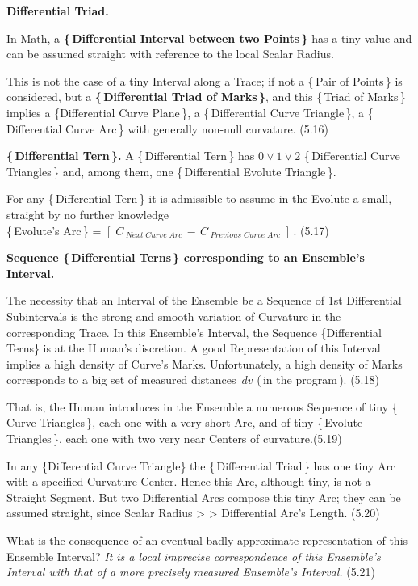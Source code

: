 \documentclass[12pt]{article} %
\begin{document}
\noindent \textbf{Differential Triad.} 

\noindent In Math, a \textbf{\{\,Differential Interval between two Points\,\}} has a tiny value and can be assumed straight with reference to the local Scalar Radius.

\noindent This is not the case of a tiny Interval along a Trace; if not a \{\,Pair of Points\,\} is considered, but a \textbf{\{\,Differential Triad of Marks\,\}}, and this \{\,Triad of Marks\,\} implies
 a \{Differential Curve Plane\,\}, a \{\,Differential Curve Triangle\,\}, a \{\,Differential Curve Arc\,\} with generally non-null curvature. (5.16) 

\noindent \textbf{\{\,Differential Tern\,\}.} A \{\,Differential Tern\,\} has $0 \vee 1 \vee 2$ \{\,Differential Curve Triangles\,\} and, among them, one \{\,Differential Evolute Triangle\,\}.

\noindent For any \{\,Differential Tern\,\} it is admissible to assume in the Evolute a small, straight by no further knowledge\\ \{\,Evolute's Arc\,\} = $[\;C_{\;Next\;Curve\;Arc}\,-\,C_{\;Previous\;Curve\;Arc}\;]$\,. \qquad \qquad (5.17)

\noindent \textbf{Sequence \{\,Differential Terns\,\} corresponding to an Ensemble's Interval.}

\noindent The necessity that an Interval of the Ensemble be a Sequence of 1st Differential Subintervals is the strong and smooth variation of Curvature in the corresponding Trace. In this Ensemble's Interval, the Sequence \{\;Differential Terns\;\} is at the Human's discretion. A good Representation of this Interval implies a high density of Curve's Marks. Unfortunately, a high density of Marks corresponds to a big set of measured distances\, $dv$ (\,in the program\,). (5.18)

\noindent That is, the Human introduces in the Ensemble a numerous Sequence of tiny \{\,Curve Triangles\,\}, each one with a very short Arc, and of tiny \{\,Evolute Triangles\,\}, each one with two very near Centers of curvature.\qquad (5.19)

\noindent In any \{Differential Curve Triangle\} the \{\,Differential Triad\,\} has one tiny Arc with a specified Curvature Center. Hence this Arc, although tiny, is not a Straight Segment. But two Differential Arcs compose this tiny Arc; they can be assumed straight, since Scalar Radius > > Differential Arc's Length. \qquad (5.20)

\noindent What is the consequence of an eventual badly approximate representation of this Ensemble Interval? \textsl{It is a local imprecise correspondence of this Ensemble's Interval with that of a more precisely measured Ensemble's Interval.} \qquad (5.21) 
\end{document}
